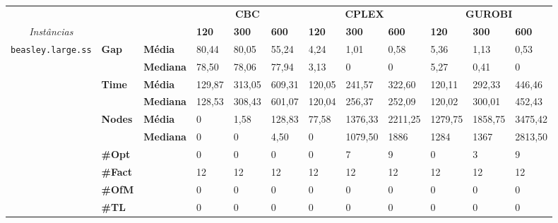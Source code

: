 
\begin{table}[]
	\begin{footnotesize}
	\begin{adjustbox}{angle=90}
	\begin{tabular}{c@{\hskip 0.2cm}l@{\hskip 0.1cm}l|lll|lll|lll}
	& & & \multicolumn{3}{c}{\textbf{CBC}} & \multicolumn{3}{c}{\textbf{CPLEX}} & \multicolumn{3}{c}{\textbf{GUROBI}} 	\\\textit{Instâncias} & & & \textbf{120} & \textbf{300} & \textbf{600} & \textbf{120} & \textbf{300} & \textbf{600} & \textbf{120} & \textbf{300} & \textbf{600} \\
\hline
\multirow{7}{*}{\texttt{beasley.large.ss}} & \multirow{2}{*}{\textbf{Gap}} & \textbf{Média} & 80,44 & 80,05 & 55,24 & 4,24 & 1,01 & 0,58 & 5,36 & 1,13 & 0,53 \\
 & & \textbf{Mediana} & 78,50 & 78,06 & 77,94 & 3,13 & 0 & 0 & 5,27 & 0,41 & 0 \\
\cline{2-12}
 & \multirow{2}{*}{\textbf{Time}} & \textbf{Média} & 129,87 & 313,05 & 609,31 & 120,05 & 241,57 & 322,60 & 120,11 & 292,33 & 446,46 \\
 & & \textbf{Mediana} & 128,53 & 308,43 & 601,07 & 120,04 & 256,37 & 252,09 & 120,02 & 300,01 & 452,43 \\
\cline{2-12}
 & \multirow{2}{*}{\textbf{Nodes}} & \textbf{Média} & 0 & 1,58 & 128,83 & 77,58 & 1376,33 & 2211,25 & 1279,75 & 1858,75 & 3475,42 \\
 & & \textbf{Mediana} & 0 & 0 & 4,50 & 0 & 1079,50 & 1886 & 1284 & 1367 & 2813,50 \\
\cline{2-12}
 & \textbf{\#Opt} & & 0 & 0 & 0 & 0 & 7 & 9 & 0 & 3 & 9 \\
 & \textbf{\#Fact} & & 12 & 12 & 12 & 12 & 12 & 12 & 12 & 12 & 12 \\
 & \textbf{\#OfM} & & 0 & 0 & 0 & 0 & 0 & 0 & 0 & 0 & 0 \\
 & \textbf{\#TL} & & 0 & 0 & 0 & 0 & 0 & 0 & 0 & 0 & 0 \\
	\end{tabular}
	\end{adjustbox}
	\end{footnotesize}
	\label{cflp:tab:4}
	\caption{}
\end{table}

